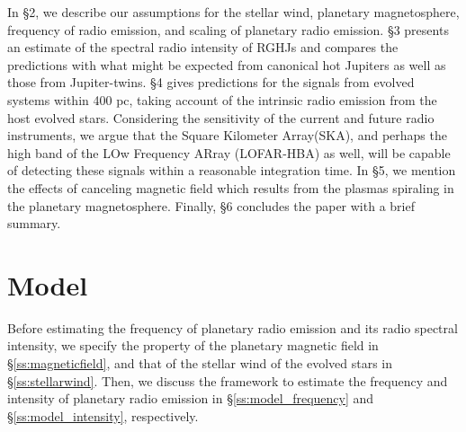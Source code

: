 \documentclass[iop,numberedappendix,apj]{emulateapj}
\def\memoYF#1{\color{red}$[${\bf #1}$]$ \color{black}}
\begin{document}
In \S2, we describe our assumptions for the stellar wind, planetary magnetosphere, frequency of radio emission, and scaling of planetary radio emission.
\S3 presents an estimate of the spectral radio intensity of RGHJs and compares the predictions with what might be expected from canonical hot Jupiters as well as those from Jupiter-twins.
\S4 gives predictions for the signals from evolved systems within 400 pc, taking account of the intrinsic radio emission from the host evolved stars. Considering the sensitivity of the current and future radio instruments, we argue that the Square Kilometer Array(SKA), and perhaps the high band of the LOw Frequency ARray (LOFAR-HBA) as well, will be capable of detecting these signals within a reasonable integration time. 
In \S5, we mention the effects of canceling magnetic field which results from the plasmas spiraling in the planetary magnetosphere.  
Finally, \S6 concludes the paper with a brief summary. 



\section{Model}
\label{s:assumptions}

Before estimating the frequency of planetary radio emission and its radio spectral intensity, we specify the property of the planetary magnetic field in \S\ref{ss:magneticfield}, and that of the stellar wind of the evolved stars in \S\ref{ss:stellarwind}.  
Then, we discuss the framework to estimate the frequency and intensity of planetary radio emission in \S\ref{ss:model_frequency} and \S\ref{ss:model_intensity}, respectively. 
\end{document}
